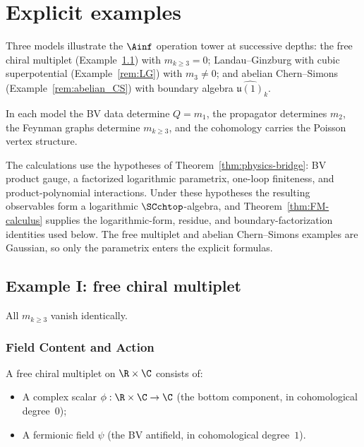 \section{Explicit examples}
\label{sec:examples}

Three models illustrate the $\Ainf$ operation tower at successive depths: the free chiral multiplet (Example~\ref{rem:free_chiral}) with $m_{k \ge 3} = 0$; Landau--Ginzburg with cubic superpotential (Example~\ref{rem:LG}) with $m_3 \neq 0$; and abelian Chern--Simons (Example~\ref{rem:abelian_CS}) with boundary algebra $\widehat{\mathfrak{u}(1)}_k$.

In each model the BV data determine $Q=m_1$, the propagator determines
$m_2$, the Feynman graphs determine $m_{k\geq 3}$, and the cohomology
carries the Poisson vertex structure.

\begin{remark}
The calculations use the hypotheses of Theorem~\ref{thm:physics-bridge}:
BV product gauge, a factorized logarithmic parametrix, one-loop finiteness,
and product-polynomial interactions. Under these hypotheses the resulting
observables form a logarithmic $\SCchtop$-algebra, and
Theorem~\ref{thm:FM-calculus} supplies the logarithmic-form, residue, and
boundary-factorization identities used below. The free multiplet and
abelian Chern--Simons examples are Gaussian, so only the parametrix enters
the explicit formulas.
\end{remark}

\subsection{Example I: free chiral multiplet}
\label{rem:free_chiral}

All $m_{k \geq 3}$ vanish identically.

\subsubsection{Field Content and Action}

A free chiral multiplet on $\R \times \C$ consists of:
\begin{itemize}
\item A complex scalar $\phi : \R \times \C \to \C$ (the bottom component, in cohomological degree~$0$);
\item A fermionic field $\psi$ (the BV antifield, in cohomological degree~$1$).
\end{itemize}

